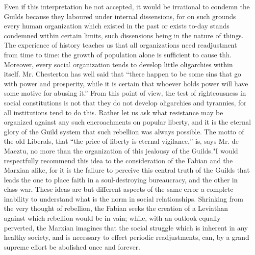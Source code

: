 \documentclass{book}
\begin{document}
Even if this interpretation be not accepted, it would be irrational to condemn the Guilds because they laboured under internal dissensions, for on such grounds every human organization which existed in the past or exists to-day stands condemned within certain limits, such dissensions being in the nature of things. The experience of history teaches us that all organizations need readjustment from time to time: the growth of population alone is sufficient to cause thh. Moreover, every social organization tends to develop little oligarchies within itself. Mr. Chesterton has well said that “there happen to be some sins that go with power and prosperity, while it is certain that whoever holds power will have some motive for abusing it.” From this point of view, the test of righteousness in social constitutions is not that they do not develop oligarchies and tyrannies, for all institutions tend to do this. Rather let us ask what resistance may be organized against any such encroachments on popular liberty, and it is the eternal glory of the Guild system that such rebellion was always possible. The motto of the old Liberals, that “the price of liberty is eternal vigilance,” is, says Mr. de Maeztu, no more than the organization of this jealousy of the Guilds."\footnotemark[8] I would respectfully recommend this idea to the consideration of the Fabian and the Marxian alike, for it is the failure to perceive this central truth of the Guilds that leads the one to place faith in a soul-destroying bureaucracy, and the other in class war. These ideas are but different aspects of the same error a complete inability to understand what is the norm in social relationships. Shrinking from the very thought of rebellion, the Fabian seeks the creation of a Leviathan against which rebellion would be in vain; while, with an outlook equally perverted, the Marxian imagines that the social struggle which is inherent in any healthy society, and is necessary to effect periodic readjustments, can, by a grand supreme effort be abolished once and forever.
\end{document}
